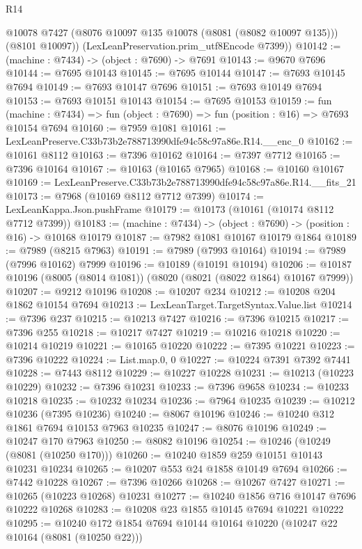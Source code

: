 \begin{lexlean}{R14}
\begin{coremodule}
        @10078
        @7427
        (@8076 @10097 @135 @10078 (@8081 (@8082 @10097 @135)))
        (@8101 @10097))
      (LexLeanPreservation.prim_utf8Encode @7399))
@10142 := (machine : @7434) -> (object : @7690) -> @7691
@10143 := @9670 @7696
@10144 := @7695 @10143
@10145 := @7695 @10144
@10147 := @7693 @10145 @7694
@10149 := @7693 @10147 @7696
@10151 := @7693 @10149 @7694
@10153 := @7693 @10151 @10143
@10154 := @7695 @10153
@10159 := fun (machine : @7434) =>
  fun (object : @7690) => fun (position : @16) => @7693 @10154 @7694
@10160 := @7959 @1081
@10161 := LexLeanPreserve.C33b73b2e788713990dfe94c58c97a86e.R14.__enc_0
@10162 := @10161 @8112
@10163 := @7396 @10162
@10164 := @7397 @7712
@10165 := @7396 @10164
@10167 := @10163 (@10165 @7965)
@10168 := @10160 @10167
@10169 := LexLeanPreserve.C33b73b2e788713990dfe94c58c97a86e.R14.__fits_21
@10173 := @7968 (@10169 @8112 @7712 @7399)
@10174 := LexLeanKappa.Json.pushFrame
@10179 := @10173 (@10161 (@10174 @8112 @7712 @7399))
@10183 := (machine : @7434) -> (object : @7690) -> (position : @16) -> @10168 @10179
@10187 := @7982 @1081 @10167 @10179 @1864
@10189 := @7989 (@8215 @7963)
@10191 := @7989 (@7993 @10164)
@10194 := @7989 (@7996 @10162) @7999
@10196 := @10189 (@10191 @10194)
@10206 := @10187 @10196 (@8005 (@8014 @1081)) (@8020 (@8021 (@8022 @1864) @10167 @7999))
@10207 := @9212 @10196
@10208 := @10207 @234
@10212 := @10208 @204 @1862 @10154 @7694
@10213 := LexLeanTarget.TargetSyntax.Value.list
@10214 := @7396 @237
@10215 := @10213 @7427
@10216 := @7396 @10215
@10217 := @7396 @255
@10218 := @10217 @7427
@10219 := @10216 @10218
@10220 := @10214 @10219
@10221 := @10165 @10220
@10222 := @7395 @10221
@10223 := @7396 @10222
@10224 := List.map.{0, 0}
@10227 := @10224 @7391 @7392 @7441
@10228 := @7443 @8112
@10229 := @10227 @10228
@10231 := @10213 (@10223 @10229)
@10232 := @7396 @10231
@10233 := @7396 @9658
@10234 := @10233 @10218
@10235 := @10232 @10234
@10236 := @7964 @10235
@10239 := @10212 @10236 (@7395 @10236)
@10240 := @8067 @10196
@10246 := @10240 @312 @1861 @7694 @10153 @7963 @10235
@10247 := @8076 @10196
@10249 := @10247 @170 @7963
@10250 := @8082 @10196
@10254 := @10246 (@10249 (@8081 (@10250 @170)))
@10260 := @10240 @1859 @259 @10151 @10143 @10231 @10234
@10265 := @10207 @553 @24 @1858 @10149 @7694
@10266 := @7442 @10228
@10267 := @7396 @10266
@10268 := @10267 @7427
@10271 := @10265 (@10223 @10268) @10231
@10277 := @10240 @1856 @716 @10147 @7696 @10222 @10268
@10283 := @10208 @23 @1855 @10145 @7694 @10221 @10222
@10295 := @10240 @172 @1854 @7694 @10144 @10164 @10220 (@10247 @22 @10164 (@8081 (@10250 @22)))

\end{coremodule}
\end{lexlean}
